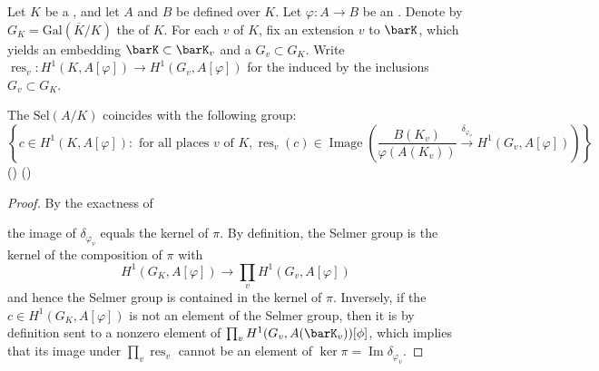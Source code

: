 \begin{proposition} \label{proposition:selmer_group_of_a_commutative_group_scheme_over_a_global_field_is_group_of_galois_cocycles_whose_restriction_are_local_mordell_weil_groups}
    Let $K$ be a , and let $A$ and $B$ be  defined over $K$. Let $\varphi: A \to B$ be an .  
    Denote by $G_K = \mathrm{Gal}(\overline{K}/K)$ the  of $K$. For each  $v$ of $K$, fix an extension $v$ to $\barK$, which yields an embedding $\barK \subset \barK_v$ and a  $G_v \subset G_K$. Write $\operatorname{res}_v: H^1(K, A[\varphi]) \to H^1(G_v, A[\varphi])$ for the  induced by the inclusions $G_v \subset G_K$.

    The  $\mathrm{Sel}(A/K)$ coincides with the following group:
    $$\left\{c \in H^1(K, A[\varphi]): \text{ for all places } v \text{ of } K, \operatorname{res}_v(c) \in \operatorname{Image}\left( \frac{B(K_v)}{\varphi(A(K_v))} \xrightarrow{\delta_{\varphi_v}} H^1(G_v, A[\varphi]) \right)  \right \}$$
    () () 
\end{proposition}
\begin{proof}
    By the exactness of 
    \begin{center}
    \end{center}
    the image of $\delta_{\varphi_v}$ equals the kernel of $\pi$. By definition, the Selmer group is the kernel of the composition of $\pi$ with 
    $$H^1(G_K, A[\varphi]) \to \prod_v H^1(G_v,A[\varphi])$$
    and hence the Selmer group is contained in the kernel of $\pi$. Inversely, if the $c \in H^1(G_K, A[\varphi])$ is not an element of the Selmer group, then it is by definition sent to a nonzero element of $\prod_v H^1(G_v,A(\barK_v))[\phi]$, which implies that its image under $\prod_v \operatorname{res}_v$ cannot be an element of $\ker \pi = \operatorname{Im} \delta_{\varphi_v}$. 
\end{proof}